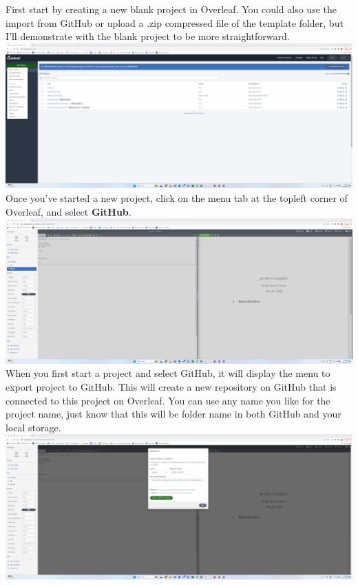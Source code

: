 \documentclass[12pt]{article}
\begin{document}
First start by creating a new blank project in Overleaf. You could also use the import from GitHub or upload a .zip compressed file of the template folder, but I'll demonstrate with the blank project to be more straightforward. \\


\includegraphics[width=1\textwidth]{Instructions/project_template_screenshots/project_template_01.png} \\

Once you've started a new project, click on the menu tab at the topleft corner of Overleaf, and select \textbf{GitHub}. \\

\includegraphics[width=1\textwidth]{Instructions/project_template_screenshots/project_template_02.png} \\

When you first start a project and select GitHub, it will display the menu to export project to GitHub. This will create a new repository on GitHub that is connected to this project on Overleaf. You can use any name you like for the project name, just know that this will be folder name in both GitHub and your local storage. \\

\includegraphics[width=1\textwidth]{Instructions/project_template_screenshots/project_template_03.png}\\
\end{document}
